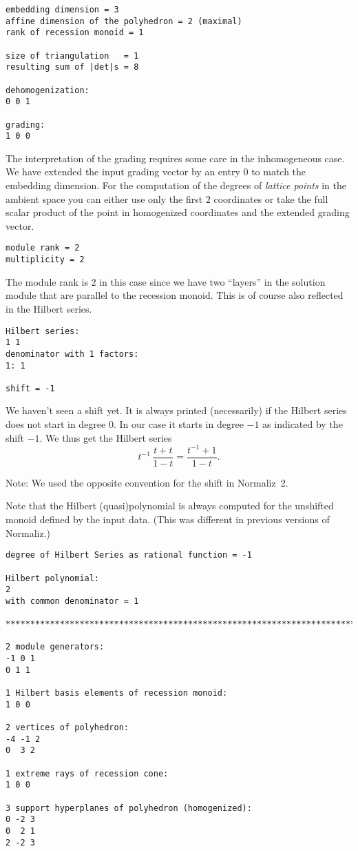\documentclass[12pt,a4paper]{scrartcl}
\theoremstyle{definition}
\begin{document}
\begin{Verbatim}
embedding dimension = 3
affine dimension of the polyhedron = 2 (maximal)
rank of recession monoid = 1

size of triangulation   = 1
resulting sum of |det|s = 8

dehomogenization:
0 0 1 

grading:
1 0 0 
\end{Verbatim}
The interpretation of the grading requires some care in the inhomogeneous case. We have extended the input grading vector by an entry $0$ to match the embedding dimension. For the computation of the degrees of \emph{lattice points} in the ambient space you can either use only the first $2$ coordinates or take the full scalar product of the point in homogenized coordinates and the extended grading vector.

\begin{Verbatim}
module rank = 2
multiplicity = 2
\end{Verbatim}
The module rank is $2$ in this case since we have two ``layers'' in the solution module that are parallel to the recession monoid. This is of course also reflected in the Hilbert series.
\begin{Verbatim}
Hilbert series:
1 1 
denominator with 1 factors:
1: 1  

shift = -1
\end{Verbatim}
We haven't seen a shift yet. It is always printed (necessarily) if the Hilbert series does not start in degree $0$. In our case it starts in degree $-1$ as indicated by the shift $-1$. We thus get the Hilbert series
$$
t^{-1}\,\frac{t+t}{1-t}=\frac{t^{-1}+1}{1-t}.
$$

Note: We used the opposite convention for the shift in Normaliz~2.

Note that the Hilbert (quasi)polynomial is always computed for the unshifted monoid defined by the input data. (This was different in previous versions of Normaliz.)
\begin{Verbatim}
degree of Hilbert Series as rational function = -1

Hilbert polynomial:
2 
with common denominator = 1

***********************************************************************

2 module generators:
-1 0 1
0 1 1

1 Hilbert basis elements of recession monoid:
1 0 0

2 vertices of polyhedron:
-4 -1 2
0  3 2

1 extreme rays of recession cone:
1 0 0

3 support hyperplanes of polyhedron (homogenized):
0 -2 3
0  2 1
2 -2 3
\end{Verbatim}
\end{document}
